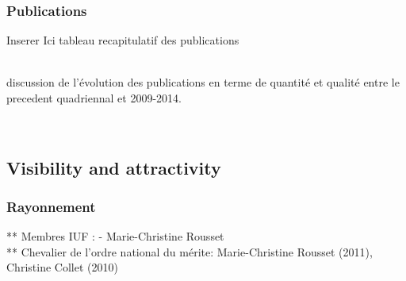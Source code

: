 
\subsubsection{Publications} %


Inserer Ici tableau recapitulatif des publications 

\ \\

discussion de l'{\'e}volution des publications en terme de quantit{\'e} et qualit{\'e} entre le precedent quadriennal et 2009-2014. 

\ \\


\newpage
\subsection{Visibility and attractivity} %
\label{sub:hadas_visibility_and_attractivity}


\subsubsection{Rayonnement}
** Membres IUF : - Marie-Christine Rousset \\
** Chevalier de l'ordre national du m{\'e}rite: Marie-Christine Rousset (2011), Christine Collet (2010)


